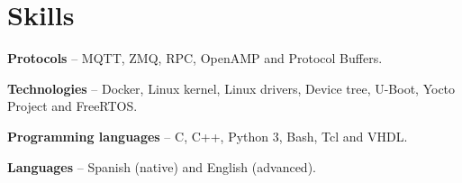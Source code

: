\section{Skills}
\begin{small}
	\parbox[t][][t]{\linewidth}{
		\textbf{Protocols} -- {MQTT, ZMQ, RPC, OpenAMP and Protocol Buffers.}
		\bigbreak
	}
	\parbox[t][][t]{\linewidth}{
		\textbf{Technologies} -- {Docker, Linux kernel, Linux drivers, Device tree, U-Boot, Yocto Project and FreeRTOS.}
		\bigbreak
	}
	\parbox[t][][t]{\linewidth}{
		\textbf{Programming languages} -- {C, C++, Python 3, Bash, Tcl and VHDL.}
		\bigbreak
	}
	\parbox[t][][t]{\linewidth}{
		\textbf{Languages} -- {Spanish (native) and English (advanced).}
		\bigbreak
	}
\end{small}
